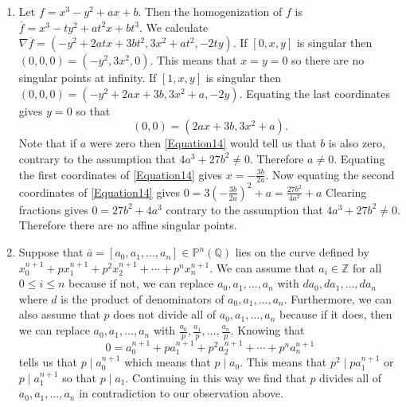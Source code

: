 \documentclass[12pt]{article}
\begin{document}
\begin{enumerate}
\item %
Let $f=x^3-y^2+ax+b$. Then the homogenization of $f$
is $\overline{f}=x^3-ty^2+at^2x+bt^3$. We calculate
$\nabla\overline{f}=\left(-y^2+2atx+3bt^2,3x^2+at^2,-2ty\right)$.
If $\left[0,x,y\right]$ is singular then
$\left(0,0,0\right)=\left(-y^2,3x^2,0\right)$.
This means that $x=y=0$ so there are no singular points at infinity.
If $\left[1,x,y\right]$ is singular then
$\left(0,0,0\right)=\left(-y^2+2ax+3b,3x^2+a,-2y\right)$.
Equating the last coordinates gives $y=0$ so that
\begin{equation}\label{Equation14}
\left(0,0\right)=\left(2ax+3b,3x^2+a\right).
\end{equation}
Note that if $a$ were zero then \autoref{Equation14}
would tell us that $b$ is also zero, contrary to the
assumption that $4a^3+27b^2\ne 0$. Therefore $a\ne 0$.
Equating the first coordinates of \autoref{Equation14}
gives $x=-\frac{3b}{2a}$.
Now equating the second coordinates of \autoref{Equation14}
gives $0=3\left(-\frac{3b}{2a}\right)^2+a=\frac{27b^2}{4a^2}+a$
Clearing fractions gives $0=27b^2+4a^3$ contrary to the
assumption that $4a^3+27b^2\ne 0$. Therefore there are no
affine singular points.

\item %
Suppose that $\overline{a}
=\left[a_0,a_1,\ldots,a_n\right]\in\mathbb{P}^n\left(\mathbb{Q}\right)$ lies
on the curve defined by $x_0^{n+1}+px_1^{n+1}+p^2x_2^{n+1}
+\cdots+p^nx_n^{n+1}$. We can assume that $a_i\in\mathbb{Z}$ for
all $0\le i\le n$ because if not, we can replace $a_0,a_1,\ldots,a_n$
with $da_0,da_1,\ldots,da_n$ where $d$ is the product of denominators
of $a_0,a_1,\ldots,a_n$. Furthermore, we can also assume that $p$
does not divide all of $a_0,a_1,\ldots,a_n$ because if it does, then we
can replace
$a_0,a_1,\ldots,a_n$ with $\frac{a_0}{p},\frac{a_1}{p},\ldots,\frac{a_n}{p}$.
Knowing that
\[0=a_0^{n+1}+pa_1^{n+1}+p^2a_2^{n+1}
+\cdots+p^na_n^{n+1}\]
tells us that $p\mid a_0^{n+1}$ which means that $p\mid a_0$.
This means that $p^2\mid pa_1^{n+1}$ or $p\mid a_1^{n+1}$
so that $p\mid a_1$. Continuing in this way we find that $p$ divides
all of $a_0,a_1,\ldots,a_n$ in contradiction to our observation above.
\end{enumerate}
\end{document}
